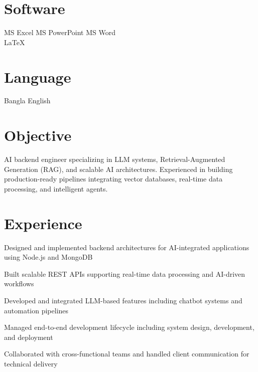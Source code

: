 \documentclass[]{deedy-resume-openfont}
\begin{document}
\begin{minipage}[t]{0.33\textwidth}
\section{Software}
MS Excel \textbullet{} MS PowerPoint \textbullet{} MS Word \\
LaTeX
\sectionsep

\section{Language}
Bangla \textbullet{} English
\sectionsep

\end{minipage}\hfill
\begin{minipage}[t]{0.64\textwidth}


\section{Objective}
AI backend engineer specializing in LLM systems, Retrieval-Augmented Generation (RAG), and scalable AI architectures. Experienced in building production-ready pipelines integrating vector databases, real-time data processing, and intelligent agents.
\sectionsep


\section{Experience}

\vspace{\topsep}
\begin{tightemize}
\item Designed and implemented backend architectures for AI-integrated applications using Node.js and MongoDB
\item Built scalable REST APIs supporting real-time data processing and AI-driven workflows
\item Developed and integrated LLM-based features including chatbot systems and automation pipelines
\item Managed end-to-end development lifecycle including system design, development, and deployment
\item Collaborated with cross-functional teams and handled client communication for technical delivery
\end{tightemize}
\sectionsep


\end{minipage}
\end{document}
